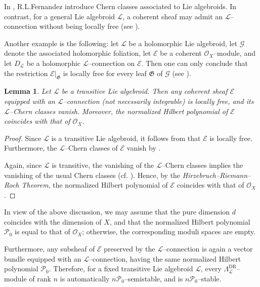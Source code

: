 \documentclass[12pt,reqno]{amsart}
\numberwithin{equation}{subsection}
\newtheorem{lem}[equation]{Lemma}
\theoremstyle{definition}
\theoremstyle{theorem}
\begin{document}
In \cite[\S\,4]{R.L.Fernandez-2002}, R.L.Fernandez introduce Chern classes associated to Lie algebroids. In contrast, for a general Lie algebroid $\mathcal{L}$, a coherent sheaf may admit an $\mathcal{L}$--connection without being locally free (see \cite[\S\,2.2, Example~2.12]{GLP-2018}).

Another example is the following: let $\mathcal{L}$ be a holomorphic Lie algebroid, let $\mathcal{G}$ denote the associated holomorphic foliation, let $\mathcal{E}$ be a coherent $\mathcal{O}_{X}$--module, and let $D_{\mathcal{L}}$ be a holomorphic $\mathcal{L}$--connection on $\mathcal{E}$. Then one can only conclude that the restriction $\mathcal{E}|_{\mathfrak{G}}$ is locally free for every leaf $\mathfrak{G}$ of $\mathcal{G}$ (see \cite{R.L.Fernandez-2002}).



\begin{lem}\label{lem:transitive-Lie-algebroid-locally-free}
	Let $\mathcal{L}$ be a transitive Lie algebroid. Then any coherent sheaf $\mathcal{E}$ equipped with an $\mathcal{L}$--connection (not necessarily integrable) is locally free, and its $\mathcal{L}$--Chern classes vanish. Moreover, the normalized Hilbert polynomial of $\mathcal{E}$ coincides with that of $\mathcal{O}_{X}$.
\end{lem}

\begin{proof}
	Since $\mathcal{L}$ is a transitive Lie algebroid, it follows from \cite[\S\,2.2, Proposition~2.15]{GLP-2018} that $\mathcal{E}$ is locally free. Furthermore, the $\mathcal{L}$--Chern classes of $\mathcal{E}$ vanish by \cite[\S\,2, Theorem~18]{P.Tortella-2011T}.
	
	Again, since $\mathcal{L}$ is transitive, the vanishing of the $\mathcal{L}$--Chern classes implies the vanishing of the usual Chern classes (cf. \cite{Crainic-2009}). Hence, by the \textit{Hirzebruch--Riemann--Roch Theorem}, the normalized Hilbert polynomial of $\mathcal{E}$ coincides with that of $\mathcal{O}_{X}$.
\end{proof}

In view of the above discussion, we may assume that the pure dimension $d$ coincides with the dimension of $X$, and that the normalized Hilbert polynomial $\mathcal{P}_{0}$ is equal to that of $\mathcal{O}_{X}$; otherwise, the corresponding moduli spaces are empty.

Furthermore, any subsheaf of $\mathcal{E}$ preserved by the $\mathcal{L}$--connection is again a vector bundle equipped with an $\mathcal{L}$--connection, having the same normalized Hilbert polynomial $\mathcal{P}_{0}$. Therefore, for a fixed transitive Lie algebroid $\mathcal{L}$, every $\Lambda^{\mathrm{DR}}_{\mathcal{L}}$--module of rank $n$ is automatically $n\mathcal{P}_{0}$--semistable, and is $n\mathcal{P}_{0}$--stable.
\end{document}
